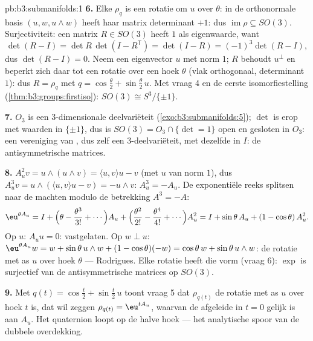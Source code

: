 \begin{solution}{pb:b3:submanifolds:1}
\textbf{6.} Elke $\rho_q$ is een rotatie om $u$ over $\theta$: in
de orthonormale basis $(u, w, u\wedge w)$ heeft haar matrix
determinant $+1$: dus $\operatorname{im}\rho \subseteq SO(3)$.
Surjectiviteit: een matrix $R \in SO(3)$ heeft $1$ als
eigenwaarde, want
\[
\det(R - I) = \det R\,\det(I - R^{\mathsf T}) = \det(I - R)
= (-1)^3\det(R - I),
\]
dus $\det(R - I) = 0$. Neem een eigenvector $u$ met norm $1$; $R$
behoudt $u^\perp$ en beperkt zich daar tot een rotatie over een
hoek $\theta$ (vlak orthogonaal, determinant $1$): dus $R =
\rho_q$ met $q = \cos\frac\theta2 + \sin\frac\theta2\,u$. Met
vraag 4 en de eerste isomorfiestelling
(\cref{thm:b3:groups:firstiso}): $SO(3) \cong S^3/\{\pm1\}$.

\textbf{7.} $O_3$ is een  $3$-dimensionale deelvariëteit
(\cref{exo:b3:submanifolds:5}); $\det$ is erop  met
waarden in $\{\pm1\}$, dus is $SO(3) = O_3\cap\{\det = 1\}$ open
en gesloten in $O_3$: een vereniging van ,
dus zelf een  $3$-deelvariëteit, met dezelfde 
in $I$: de antisymmetrische matrices.

\textbf{8.} $A_u^2v = u\wedge(u\wedge v) = \langle u, v\rangle u
- v$ (met $u$ van norm $1$), dus $A_u^3v = u\wedge(\langle
u,v\rangle u - v) = -u\wedge v$: $A_u^3 = -A_u$. De exponentiële
reeks splitsen naar de machten modulo de betrekking $A^3 = -A$:
\[
\eu^{\theta A_u} = I + \Bigl(\theta - \frac{\theta^3}{3!} +
\cdots\Bigr)A_u + \Bigl(\frac{\theta^2}{2!} -
\frac{\theta^4}{4!} + \cdots\Bigr)A_u^2
= I + \sin\theta\,A_u + (1 - \cos\theta)\,A_u^2 .
\]
Op $u$: $A_uu = 0$: vastgelaten. Op $w \perp u$: $\eu^{\theta
A_u}w = w + \sin\theta\,u\wedge w + (1 - \cos\theta)(-w) =
\cos\theta\,w + \sin\theta\,u\wedge w$: de rotatie met as $u$
over hoek $\theta$ --- Rodrigues. Elke rotatie heeft die vorm
(vraag 6): $\exp$ is surjectief van de antisymmetrische matrices
op $SO(3)$.

\textbf{9.} Met $q(t) = \cos\frac t2 + \sin\frac t2\,u$ toont
vraag 5 dat $\rho_{q(t)}$ de rotatie met as $u$ over hoek $t$ is,
dat wil zeggen $\rho_{q(t)} = \eu^{tA_u}$, waarvan de afgeleide
in $t = 0$ gelijk is aan $A_u$. Het quaternion loopt op de halve
hoek --- het analytische spoor van de dubbele overdekking.


\end{solution}
